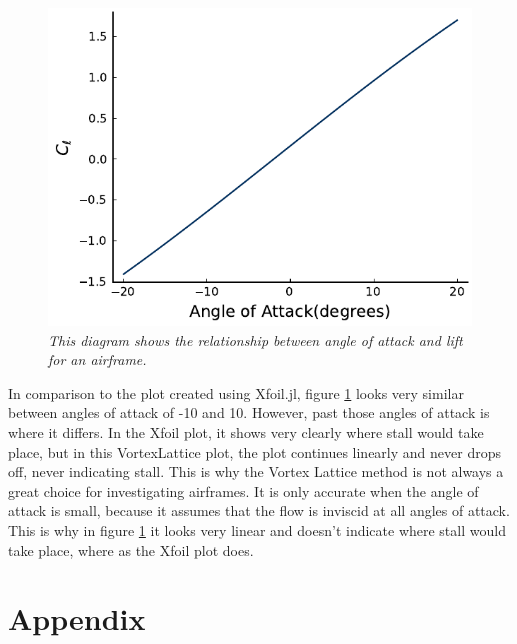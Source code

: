 \documentclass{journal}
\begin{document}
	\begin{figure}[H]
		\centering
		\includegraphics{../graphics/aoa-lift.pdf}
		\caption{\emph{This diagram shows the relationship between angle of attack and lift for an airframe.}}
		\label{fig:aoa-lift}
	\end{figure}

	In comparison to the plot created using Xfoil.jl, figure \ref{fig:aoa-lift} looks very similar between angles of attack of -10 and 10. However, past those angles of attack is where it differs. In the Xfoil plot, it shows very clearly where stall would take place, but in this VortexLattice plot, the plot continues linearly and never drops off, never indicating stall. This is why the Vortex Lattice method is not always a great choice for investigating airframes. It is only accurate when the angle of attack is small, because it assumes that the flow is inviscid at all angles of attack. This is why in figure \ref{fig:aoa-lift} it looks very linear and doesn't indicate where stall would take place, where as the Xfoil plot does.
 	
	\section*{Appendix}
	
\end{document}
